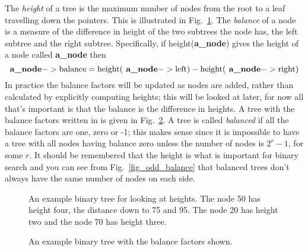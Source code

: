 \documentclass[11pt,a4paper]{scrartcl}
\begin{document}
The \textsl{ height} of a tree is the maximum number of nodes from the
root to a leaf travelling down the pointers. This is illustrated in
Fig.~\ref{fig_example_tree}. The \textsl{ balance} of a node is a measure
of the difference in height of the two subtrees the node has, the left
subtree and the right subtree. Specifically, if height(\textbf{a\_node}) gives the
height of a node called \textbf{a\_node} then
\begin{equation}
\mbox{\textbf{a\_node}}->\mbox{balance}=\mbox{height}(\mbox{\textbf{
    a\_node}}->\mbox{left})-\mbox{height}(\mbox{\textbf{
    a\_node}}->\mbox{right})
\end{equation}
In practice the balance factors will be updated as nodes are added,
rather than calculated by explicitly computing heights; this will be
looked at later, for now all that's important is that the balance is
the difference in heights. A tree with the balance factors written in
is given in Fig.~\ref{fig_example_balance}. A tree is called \textsl{
  balanced} if all the balance factors are one, zero or -1; this makes
sense since it is impossible to have a tree with all nodes having
balance zero unless the number of nodes is $2^r-1$, for some $r$. It
should be remembered that the height is what is important for binary
search and you can see from Fig.~\ref{fig_odd_balance} that balanced
trees don't always have the same number of nodes on each side.

\begin{figure}
\begin{center}
\end{center}
\caption{An example binary tree for looking at heights. The node 50
  has height four, the distance down to 75 and 95. The node 20 has
  height two and the node 70 has height
  three.\label{fig_example_tree}}
\end{figure}

\begin{figure}
\begin{center}
\end{center}
\caption{An example binary tree with the balance factors shown.\label{fig_example_balance}}
\end{figure}
\end{document}
